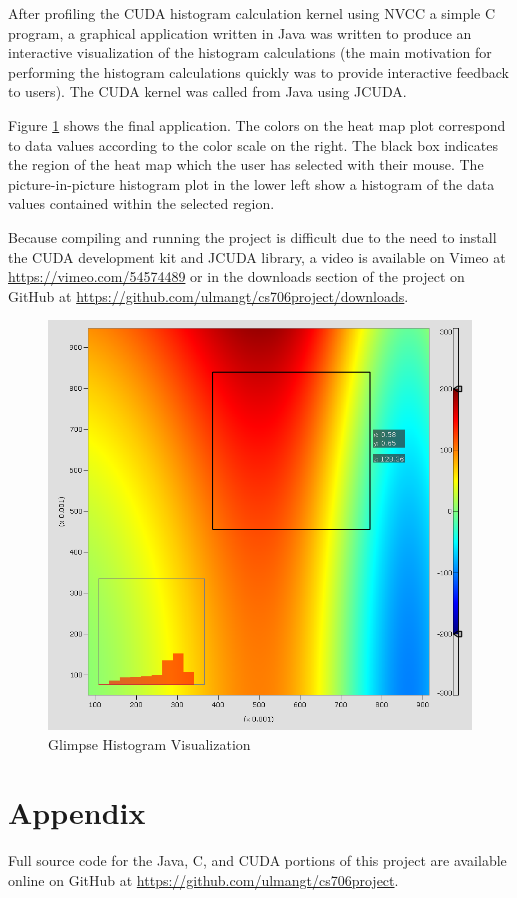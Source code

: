 \documentclass{article}
\begin{document}
After profiling the CUDA histogram calculation kernel using NVCC a simple C program, a graphical application written in Java was written to produce an interactive visualization of the histogram calculations (the main motivation for performing the histogram calculations quickly was to provide interactive feedback to users). The CUDA kernel was called from Java using JCUDA\cite{jcuda}.

Figure \ref{histogram1} shows the final application. The colors on the heat map plot correspond to data values according to the color scale on the right. The black box indicates the region of the heat map which the user has selected with their mouse. The picture-in-picture histogram plot in the lower left show a histogram of the data values contained within the selected region.

Because compiling and running the project is difficult due to the need to install the CUDA development kit and JCUDA library, a video is available on Vimeo at \url{https://vimeo.com/54574489} or in the downloads section of the project on GitHub at \url{https://github.com/ulmangt/cs706project/downloads}.

\begin{figure}
\centering
\includegraphics[width=1.0\textwidth]{screenshots/glimpse/GlimpseHistogramPlot.png}
\caption{Glimpse Histogram Visualization}
\label{histogram1}
\end{figure}

\section{Appendix}\label{appendix}

Full source code for the Java, C, and CUDA portions of this project are available online on GitHub at \url{https://github.com/ulmangt/cs706project}.



\end{document}

